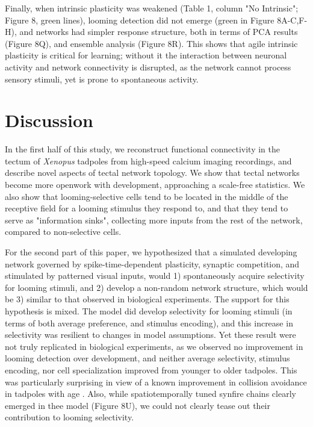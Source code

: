 \documentclass{article}
\begin{document}
Finally, when intrinsic plasticity was weakened (Table 1, column "No Intrinsic"; Figure 8, green lines), looming detection did not emerge (green in Figure 8A-C,F-H), and networks had simpler response structure, both in terms of PCA results (Figure 8Q), and ensemble analysis (Figure 8R). This shows that agile intrinsic plasticity is critical for learning; without it the interaction between neuronal activity and network connectivity is disrupted, as the network cannot process sensory stimuli, yet is prone to spontaneous activity.

\section*{Discussion}

In the first half of this study, we reconstruct functional connectivity in the tectum of \textit{Xenopus} tadpoles from high-speed calcium imaging recordings, and describe novel aspects of tectal network topology. We show that tectal networks become more openwork with development, approaching a scale-free statistics. We also show that looming-selective cells tend to be located in the middle of the receptive field for a looming stimulus they respond to, and that they tend to serve as "information sinks", collecting more inputs from the rest of the network, compared to non-selective cells.

For the second part of this paper, we hypothesized that a simulated developing network governed by spike-time-dependent plasticity, synaptic competition, and stimulated by patterned visual inputs, would 1) spontaneously acquire selectivity for looming stimuli, and 2) develop a non-random network structure, which would be 3) similar to that observed in biological experiments. The support for this hypothesis is mixed. The model did develop selectivity for looming stimuli (in terms of both average preference, and stimulus encoding), and this increase in selectivity was resilient to changes in model assumptions. Yet these result were not truly replicated in biological experiments, as we observed no improvement in looming detection over development, and neither average selectivity, stimulus encoding, nor cell specialization improved from younger to older tadpoles. This was particularly surprising in view of a known improvement in collision avoidance in tadpoles with age \citep{dong2009}. Also, while spatiotemporally tuned synfire chains clearly emerged in thee model (Figure 8U), we could not clearly tease out their contribution to looming selectivity.
\end{document}

